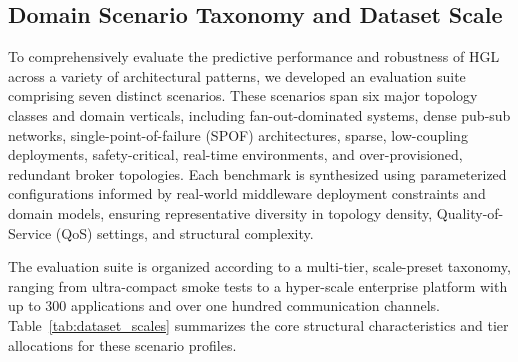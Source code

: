 \documentclass[sigconf,9pt,anonymous]{acmart}
\begin{document}
\subsection{Domain Scenario Taxonomy and Dataset Scale}

To comprehensively evaluate the predictive performance and robustness of HGL across a variety of architectural patterns, we developed an evaluation suite comprising seven distinct scenarios. These scenarios span six major topology classes and domain verticals, including fan-out-dominated systems, dense pub-sub networks, single-point-of-failure (SPOF) architectures, sparse, low-coupling deployments, safety-critical, real-time environments, and over-provisioned, redundant broker topologies. Each benchmark is synthesized using parameterized configurations informed by real-world middleware deployment constraints and domain models, ensuring representative diversity in topology density, Quality-of-Service (QoS) settings, and structural complexity.

The evaluation suite is organized according to a multi-tier, scale-preset taxonomy, ranging from ultra-compact smoke tests to a hyper-scale enterprise platform with up to 300 applications and over one hundred communication channels. Table~\ref{tab:dataset_scales} summarizes the core structural characteristics and tier allocations for these scenario profiles.
\end{document}
